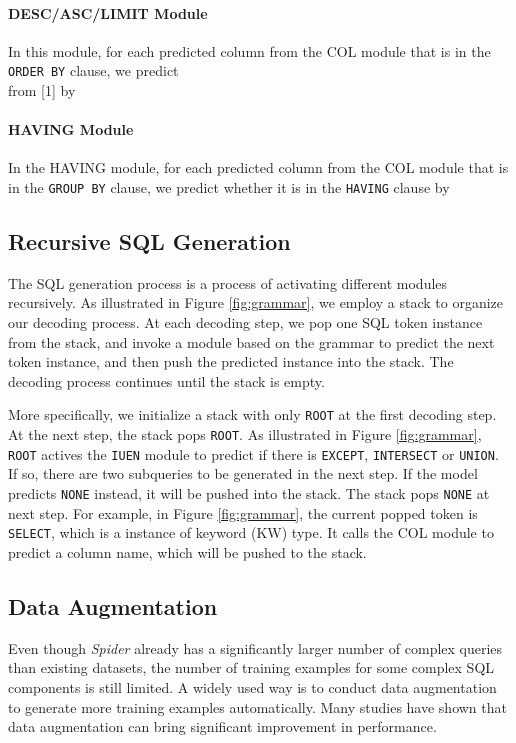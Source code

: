 \documentclass[11pt,a4paper]{article}
\begin{document}
\paragraph{DESC/ASC/LIMIT Module}
In this module, for each predicted column from the COL module that is in the \texttt{ORDER BY} clause, we predict\\ from \scalebox{0.9}[1]{} by


\paragraph{HAVING Module}
In the HAVING module, for each predicted column from the COL module that is in the \texttt{GROUP BY} clause, we predict whether it is in the \texttt{HAVING} clause by


\subsection{Recursive SQL Generation}
\label{sec:tree_decoder}

The SQL generation process is a process of activating different modules recursively. 
As illustrated in Figure \ref{fig:grammar}, we employ a stack to organize our decoding process.
At each decoding step, we pop one SQL token instance from the stack, and invoke a module based on the grammar to predict the next token instance, and then push the predicted instance into the stack. The decoding process continues until the stack is empty.

More specifically, we initialize a stack with only \texttt{ROOT} at the first decoding step.
At the next step, the stack pops \texttt{ROOT}.
As illustrated in Figure \ref{fig:grammar}, \texttt{ROOT} actives the \texttt{IUEN} module to predict if there is \texttt{EXCEPT}, \texttt{INTERSECT} or \texttt{UNION}. If so, there are two subqueries to be generated in the next step.
If the model predicts \texttt{NONE} instead, it will be pushed into the stack. The stack pops \texttt{NONE} at next step.
For example, in Figure \ref{fig:grammar}, the current popped token is \texttt{SELECT}, which is a instance of keyword (KW) type. It calls the COL module to predict a column name, which will be pushed to the stack.

\subsection{Data Augmentation}
Even though \textit{Spider} already has a significantly larger number of complex queries than existing datasets, the number of training examples for some complex SQL components is still limited.
A widely used way is to conduct data augmentation to generate more training examples automatically.
Many studies \cite{Berant14, iyer17, SuY17a} have shown that data augmentation can bring significant improvement in performance.
\end{document}
